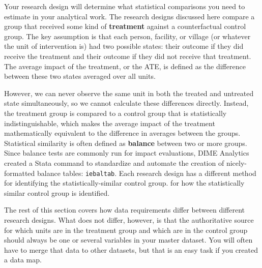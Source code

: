 Your research design will determine what statistical comparisons you need
to estimate in your analytical work.
The research designs discussed here compare a group that received
some kind of \textbf{treatment}
against a counterfactual control group.
The key assumption is that each
person, facility, or village (or whatever the unit of intervention is)
had two possible states: their outcome if they did receive the treatment
and their outcome if they did not receive that treatment.
The average impact of the treatment, or the ATE,
is defined as the difference 
between these two states averaged over all units.

However, we can never observe the same unit
in both the treated and untreated state simultaneously,
so we cannot calculate these differences directly.
Instead, the treatment group is compared to a control group
that is statistically indistinguishable,
which makes the average impact of the treatment
mathematically equivalent to the difference in averages between the groups.
Statistical similarity is often defined
as \textbf{balance} between two or more groups.	
Since balance tests are commonly run for impact evaluations,
DIME Analytics created a Stata command to 
standardize and automate the creation of nicely-formatted balance tables:
\texttt{iebaltab}.
Each research design has a different method	for identifying the statistically-similar control group. 
for how the statistically similar control group is identified.

The rest of this section covers how data requirements differ
between different research designs.
What does not differ, however, is that the authoritative source
for which units are in the treatment group and which are in the control group
should always be one or several variables in your master dataset. 
You will often have to merge that data to other datasets, 
but that is an easy task if you created a data map.


